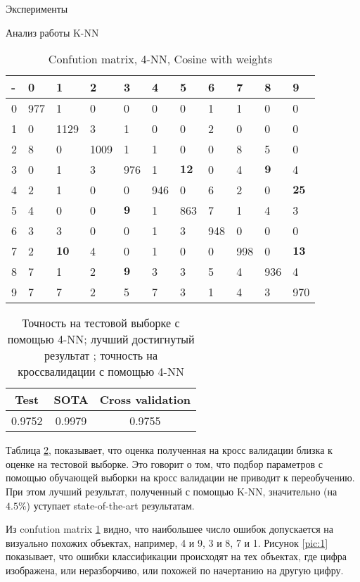 \documentclass[a4paper,12pt,titlepage,finall]{article}
\begin{document}
\begin{section}{Эксперименты}
\begin{subsection}{Анализ работы K-NN}
\begin{table}[H]
	\begin{tabular}{l|llllllllll}
		- & 0   & 1    & 2    & 3   & 4   & 5   & 6   & 7   & 8   & 9   \\
		\hline
		0 & 977 & 1    & 0    & 0   & 0   & 0   & 1   & 1   & 0   & 0   \\
		1 & 0   & 1129 & 3    & 1   & 0   & 0   & 2   & 0   & 0   & 0   \\
		2 & 8   & 0    & 1009 & 1   & 1   & 0   & 0   & 8   & 5   & 0   \\
		3 & 0   & 1    & 3    & 976 & 1   & $\bm{12}$  & 0   & 4   & $\bm{9}$   & 4   \\
		4 & 2   & 1    & 0    & 0   & 946 & 0   & 6   & 2   & 0   & $\bm{25}$  \\
		5 & 4   & 0    & 0    & $\bm{9}$   & 1   & 863 & 7   & 1   & 4   & 3   \\
		6 & 3   & 3    & 0    & 0   & 1   & 3   & 948 & 0   & 0   & 0   \\
		7 & 2   & $\bm{10}$   & 4    & 0   & 1   & 0   & 0   & 998 & 0   & $\bm{13}$  \\
		8 & 7   & 1    & 2    & $\bm{9}$   & 3   & 3   & 5   & 4   & 936 & 4   \\
		9 & 7   & 7    & 2    & 5   & 7   & 3   & 1   & 4   & 3   & 970
	\end{tabular}
	\centering
	\caption{Confution matrix, 4-NN, Cosine with weights}
	\label{tbl:3}
\end{table}
	
\begin{table}[H]
	\begin{tabular}{ccc}
		Test   & SOTA   & Cross validation \\
		\hline
		0.9752 & 0.9979 & 0.9755          
	\end{tabular}
	\centering
	\caption{Точность на тестовой выборке с помощью 4-NN; лучший достигнутый результат \cite{MNISTSOTA}; точность на кроссвалидации с помощью 4-NN}
	\label{tbl:4}
\end{table}

Таблица \ref{tbl:4}, показывает, что оценка полученная на кросс валидации близка к оценке на тестовой выборке. Это говорит о том, что подбор параметров с помощью обучающей выборки на кросс валидации не приводит к переобучению. При этом лучший результат, полученный с помощью K-NN, значительно (на $4.5\%$) уступает state-of-the-art результатам. \par
Из confution matrix \ref{tbl:3} видно, что наибольшее число ошибок допускается на визуально похожих объектах, например, 4 и 9, 3 и 8, 7 и 1. Рисунок \ref{pic:1} показывает, что ошибки классификации  происходят на тех объектах, где цифра изображена, или неразборчиво, или похожей по начертанию на другую цифру.


\end{subsection}
\end{section}
\end{document}
